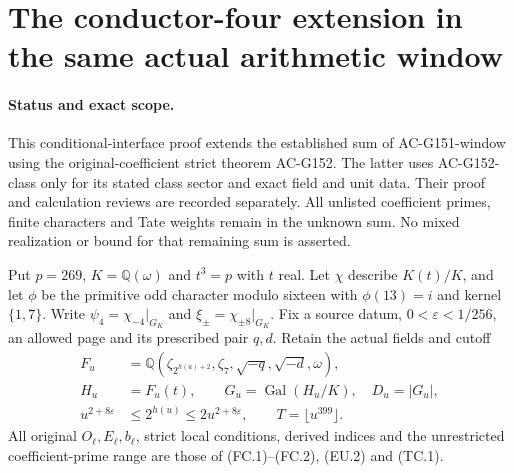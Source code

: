 \section{The conductor-four extension in the same actual arithmetic window}
\label{sec:conductor4-four-residue-window}

\paragraph{Status and exact scope.}
This conditional-interface proof extends the established sum of
AC-G151-window using the original-coefficient strict theorem AC-G152.
The latter uses AC-G152-class only for its stated class sector and
exact field and unit data.  Their proof and calculation reviews are
recorded separately.  All unlisted coefficient primes, finite
characters and Tate weights remain in the unknown sum.
No mixed realization or bound for that remaining sum is asserted.

Put $p=269$, $K=\mathbb Q(\omega)$ and $t^3=p$ with $t$ real.
Let $\chi$ describe $K(t)/K$, and let $\phi$ be the primitive odd
character modulo sixteen with $\phi(13)=i$ and kernel $\{1,7\}$.
Write $\psi_4=\chi_{-4}|_{G_K}$ and
$\xi_\pm=\chi_{\pm8}|_{G_K}$.
Fix a source datum, $0<\varepsilon<1/256$, an allowed page and
its prescribed pair $q,d$.  Retain the actual fields and cutoff
\[
 \begin{aligned}
 F_u&=\mathbb Q(\zeta_{2^{h(u)+2}},\zeta_7,
                         \sqrt{-q},\sqrt{-d},\omega),\\
 H_u&=F_u(t),\qquad G_u=\operatorname{Gal}(H_u/K),\quad D_u=|G_u|,\\
 u^{2+8\varepsilon}&\leq2^{h(u)}\leq2u^{2+8\varepsilon},
                    \qquad T=\lfloor u^{399}\rfloor.
 \end{aligned}
 \tag{C4W.1}
\]
All original $O_\ell,E_\ell,b_\ell$, strict local conditions,
derived indices and the unrestricted coefficient-prime range are
those of (FC.1)--(FC.2), (EU.2) and (TC.1).

